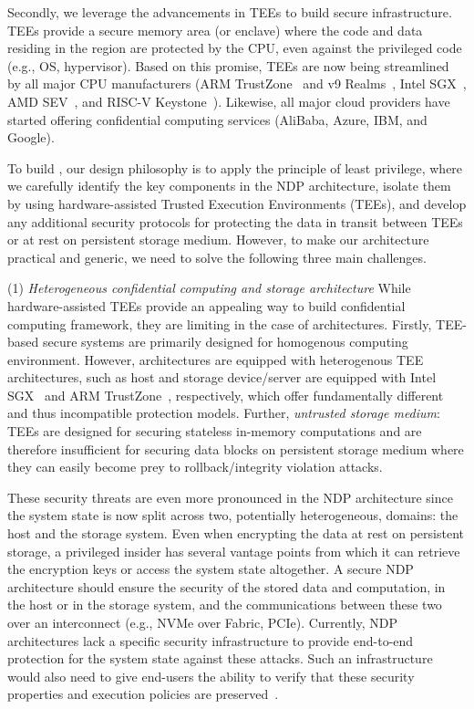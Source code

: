 Secondly, we leverage the advancements in TEEs to build secure infrastructure. TEEs provide a secure memory area (or enclave) where the code and data residing in the region are protected by the CPU, even against the privileged code (e.g., OS, hypervisor). Based on this promise, TEEs are now being streamlined by all major CPU manufacturers (ARM TrustZone~\cite{armtz} and v9 Realms~\cite{arm-cca}, Intel SGX~\cite{intelsgx}, AMD SEV~\cite{amd-sev}, and RISC-V Keystone~\cite{Lee2019}). Likewise, all major cloud providers have started offering confidential computing services (AliBaba, Azure, IBM, and Google). 


To build \project, our design philosophy is to apply the principle of least privilege, where we carefully identify the key components in the NDP architecture, isolate them by using hardware-assisted Trusted Execution Environments (TEEs), and develop any additional security protocols for protecting the data in transit between TEEs or at rest on persistent storage medium. However, to make our architecture practical and generic, we need to solve the following three main challenges.










(1) \textit{Heterogeneous confidential computing and storage architecture} While hardware-assisted TEEs provide an appealing way to build confidential computing framework, they are limiting in the case of \csd architectures. Firstly, TEE-based secure systems are primarily designed for homogenous computing environment. However, \csd architectures are equipped with heterogenous TEE architectures, such as  host and storage device/server are equipped with Intel SGX~\cite{intelsgx} and ARM TrustZone~\cite{armtz}, respectively, which offer fundamentally different and thus incompatible protection models. Further, \textit{untrusted storage medium}: TEEs are designed for securing stateless in-memory computations and are therefore insufficient for securing data blocks on persistent storage medium where they can easily become prey to rollback/integrity violation attacks. 

These security threats are even more pronounced in the NDP architecture since the system state is now split across two, potentially heterogeneous, domains: the host and the storage system. Even when encrypting the data at rest on persistent storage, a privileged insider has several vantage points from which it can retrieve the encryption keys or access the system state altogether.
A secure NDP architecture should ensure the security of the stored data and computation, in the host or in the storage system, and the communications between these two over an interconnect (e.g., NVMe over Fabric, PCIe). 
Currently, NDP architectures lack a specific security infrastructure to provide end-to-end protection for the system state against these attacks. Such an infrastructure would also need to give end-users the ability to verify that these security properties and execution policies are preserved~\cite{cidrAntonio}.






